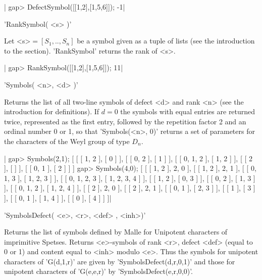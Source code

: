 |    gap> DefectSymbol([[1,2],[1,5,6]]);
      -1|


'RankSymbol( <s> )'

Let <s>$=[S_1,..,S_n]$  be a symbol given  as a tuple of  lists (see the
introduction to the section). 'RankSymbol' returns the rank of <s>.

|    gap> RankSymbol([[1,2],[1,5,6]]);
      11|


'Symbols( <n>, <d> )'

Returns  the list of all  two-line symbols of defect  <d> and rank <n> (see
the  introduction for definitions). If $d=0$ the symbols with equal entries
are  returned  twice,  represented  as  the  first  entry,  followed by the
repetition factor 2 and an ordinal number 0 or 1, so that 'Symbols(<n>, 0)'
returns  a set of parameters  for the characters of  the Weyl group of type
$D_n$.

|    gap> Symbols(2,1);
    [ [ [ 1, 2 ], [ 0 ] ], [ [ 0, 2 ], [ 1 ] ], [ [ 0, 1, 2 ], [ 1, 2 ] ],
      [ [ 2 ], [  ] ], [ [ 0, 1 ], [ 2 ] ] ]
    gap> Symbols(4,0);
    [ [ [ 1, 2 ], 2, 0 ], [ [ 1, 2 ], 2, 1 ],
      [ [ 0, 1, 3 ], [ 1, 2, 3 ] ], [ [ 0, 1, 2, 3 ], [ 1, 2, 3, 4 ] ],
      [ [ 1, 2 ], [ 0, 3 ] ], [ [ 0, 2 ], [ 1, 3 ] ],
      [ [ 0, 1, 2 ], [ 1, 2, 4 ] ], [ [ 2 ], 2, 0 ], [ [ 2 ], 2, 1 ],
      [ [ 0, 1 ], [ 2, 3 ] ], [ [ 1 ], [ 3 ] ], [ [ 0, 1 ], [ 1, 4 ] ],
      [ [ 0 ], [ 4 ] ] ]|


'SymbolsDefect( <e>, <r>, <def> , <inh>)'

Returns  the list of  symbols defined by  Malle for Unipotent characters of
imprimitive  Spetses. Returns <e>-symbols of  rank <r>, defect <def> (equal
to  0 or  1) and  content equal  to <inh>  modulo <e>. Thus the symbols for
unipotent  characters of  'G(d,1,r)' are  given by 'SymbolsDefect(d,r,0,1)'
and those for unipotent characters of 'G(e,e,r)' by
'SymbolsDefect(e,r,0,0)'.

